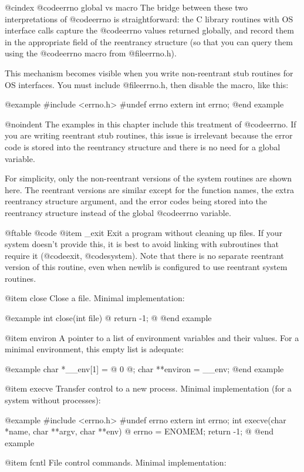 @cindex @code{errno} global vs macro
The bridge between these two interpretations of @code{errno} is
straightforward: the C library routines with OS interface calls
capture the @code{errno} values returned globally, and record them in
the appropriate field of the reentrancy structure (so that you can query
them using the @code{errno} macro from @file{errno.h}).

This mechanism becomes visible when you write non-reentrant stub
routines for OS interfaces.  You must include @file{errno.h}, then
disable the macro, like this:

@example
#include <errno.h>
#undef errno
extern int errno;
@end example

@noindent
The examples in this chapter include this treatment of @code{errno}.
If you are writing reentrant stub routines, this issue is irrelevant
because the error code is stored into the reentrancy structure and 
there is no need for a global variable.

For simplicity, only the non-reentrant versions of the system routines
are shown here.  The reentrant versions are similar except for
the function names, the extra reentrancy structure argument,
and the error codes being stored into the reentrancy structure
instead of the global @code{errno} variable.

@ftable @code
@item _exit
Exit a program without cleaning up files.  If your system doesn't
provide this, it is best to avoid linking with subroutines that require
it (@code{exit}, @code{system}).  Note that there is no separate
reentrant version of this routine, even when newlib is configured to use
reentrant system routines.

@item close
Close a file.  Minimal implementation:

@example
int close(int file) @{
  return -1;
@}
@end example

@item environ
A pointer to a list of environment variables and their values.  For a
minimal environment, this empty list is adequate:

@example
char *__env[1] = @{ 0 @};
char **environ = __env;
@end example

@item execve
Transfer control to a new process.  Minimal implementation (for a system
without processes):

@example
#include <errno.h>
#undef errno
extern int errno;
int execve(char *name, char **argv, char **env) @{
  errno = ENOMEM;
  return -1;
@}
@end example

@item fcntl
File control commands.  Minimal implementation:

